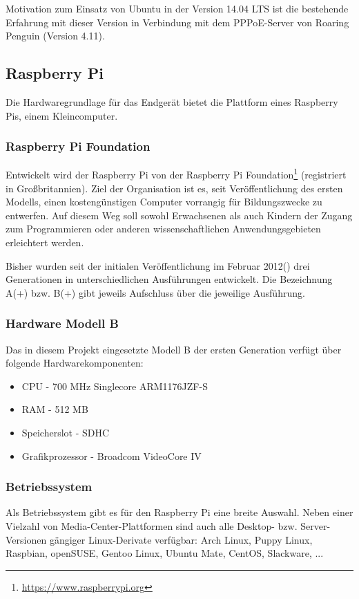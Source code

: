Motivation zum Einsatz von Ubuntu in der Version 14.04 LTS ist die bestehende Erfahrung
mit dieser Version in Verbindung mit dem PPPoE-Server von Roaring Penguin (Version 4.11).

\subsection{Raspberry Pi}

Die Hardwaregrundlage für das Endgerät bietet die Plattform eines Raspberry Pis, einem Kleincomputer.

\subsubsection{Raspberry Pi Foundation}
Entwickelt wird der Raspberry Pi von der Raspberry Pi Foundation\footnote{\url{https://www.raspberrypi.org}}
(registriert in Großbritannien). Ziel der Organisation ist es,
seit Veröffentlichung des ersten Modells, einen kostengünstigen
Computer vorrangig für Bildungszwecke zu entwerfen. Auf diesem
Weg soll sowohl Erwachsenen als auch Kindern der Zugang zum
Programmieren oder anderen wissenschaftlichen Anwendungsgebieten
erleichtert werden.

Bisher wurden seit der initialen Veröffentlichung im Februar 2012(\cite{rasppifoundweb})
drei Generationen in unterschiedlichen Ausführungen
entwickelt. Die Bezeichnung A(+) bzw. B(+) gibt jeweils Aufschluss
über die jeweilige Ausführung.

\subsubsection{Hardware Modell B}
Das in diesem Projekt eingesetzte Modell B der ersten Generation verfügt über folgende Hardwarekomponenten:
\begin{itemize}
\item CPU - 700 MHz Singlecore ARM1176JZF-S
\item RAM - 512 MB
\item Speicherslot - SDHC
\item Grafikprozessor - Broadcom VideoCore IV
\end{itemize}

\subsubsection{Betriebssystem}
Als Betriebssystem gibt es für den Raspberry Pi eine breite Auswahl.
Neben einer Vielzahl von Media-Center-Plattformen sind auch alle
Desktop- bzw. Server-Versionen gängiger Linux-Derivate verfügbar:
Arch Linux, Puppy Linux, Raspbian, openSUSE, Gentoo Linux, Ubuntu Mate,
CentOS, Slackware, ...

